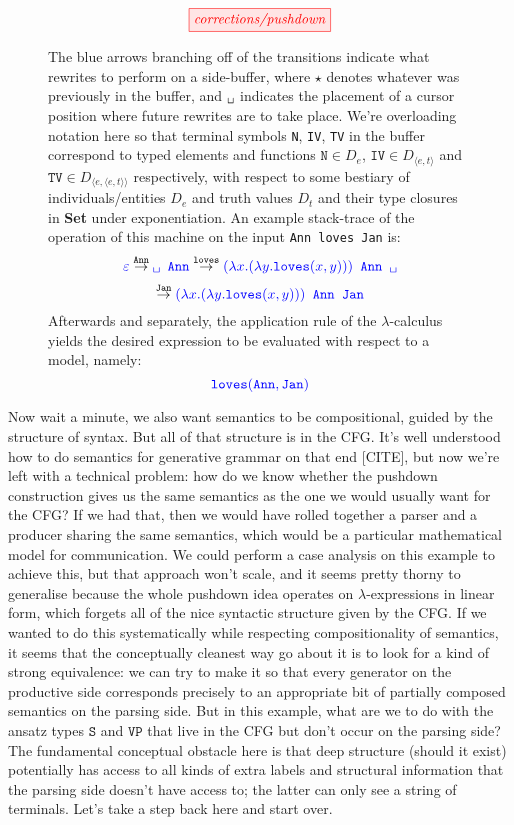 \begin{figure}
\centering
\[\tikzfig{corrections/pushdown}\]
\caption{
The blue arrows branching off of the transitions indicate what rewrites to perform on a side-buffer, where $\star$ denotes whatever was previously in the buffer, and $\texttt{\textvisiblespace}$ indicates the placement of a cursor position where future rewrites are to take place. We're overloading notation here so that terminal symbols \texttt{N}, \texttt{IV}, \texttt{TV} in the buffer correspond to typed elements and functions $\texttt{N} \in D_e$, $\texttt{IV} \in D_{\langle e,t \rangle}$ and $\texttt{TV} \in D_{\langle e, \langle e , t \rangle \rangle}$ respectively, with respect to some bestiary of individuals/entities $D_e$ and truth values $D_t$ and their type closures in \textbf{Set} under exponentiation. An example stack-trace of the operation of this machine on the input \texttt{Ann loves Jan} is:
\[
\textcolor{blue}{\varepsilon}
\overset{\texttt{Ann}}{\rightarrow}
\textcolor{blue}{\texttt{\textvisiblespace} \texttt{ Ann}}
\overset{\texttt{loves}}{\rightarrow}
\textcolor{blue}{(\lambda x. (\lambda y. \texttt{loves}(x,y)))\texttt{ Ann \textvisiblespace}}
\]
\[
\overset{\texttt{Jan}}{\rightarrow}
\textcolor{blue}{(\lambda x. (\lambda y. \texttt{loves}(x,y)))\texttt{ Ann Jan}}
\]
Afterwards and separately, the application rule of the $\lambda$-calculus yields the desired expression to be evaluated with respect to a model, namely:
\[\textcolor{blue}{\texttt{loves}(\texttt{Ann},\texttt{Jan})}\]
}
\end{figure}
Now wait a minute, we also want semantics to be compositional, guided by the structure of syntax. But all of that structure is in the CFG. It's well understood how to do semantics for generative grammar on that end [CITE], but now we're left with a technical problem: how do we know whether the pushdown construction gives us the same semantics as the one we would usually want for the CFG? If we had that, then we would have rolled together a parser and a producer sharing the same semantics, which would be a particular mathematical model for communication. We could perform a case analysis on this example to achieve this, but that approach won't scale, and it seems pretty thorny to generalise because the whole pushdown idea operates on $\lambda$-expressions in linear form, which forgets all of the nice syntactic structure given by the CFG. If we wanted to do this systematically while respecting compositionality of semantics, it seems that the conceptually cleanest way go about it is to look for a kind of strong equivalence: we can try to make it so that every generator on the productive side corresponds precisely to an appropriate bit of partially composed semantics on the parsing side. But in this example, what are we to do with the ansatz types $\texttt{S}$ and $\texttt{VP}$ that live in the CFG but don't occur on the parsing side? The fundamental conceptual obstacle here is that deep structure (should it exist) potentially has access to all kinds of extra labels and structural information that the parsing side doesn't have access to; the latter can only see a string of terminals. Let's take a step back here and start over.\\

